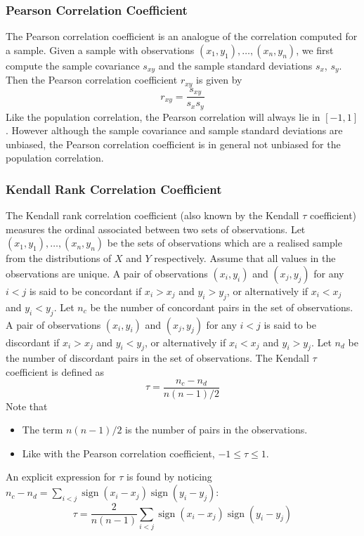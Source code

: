\documentclass[11pt]{report} %
\begin{document}
\subsubsection{Pearson Correlation Coefficient}

The Pearson correlation coefficient is an analogue of the correlation computed for a sample. Given a sample with observations $\left(x_{1}, y_{1}\right), \dots, \left(x_{n}, y_{n}\right)$, we first compute the sample covariance $s_{xy}$ and the sample standard deviations $s_{x}$, $s_{y}$. Then the Pearson correlation coefficient $r_{xy}$ is given by
\begin{equation}
r_{xy} = \dfrac{s_{xy}}{s_{x}s_{y}}
\end{equation}
Like the population correlation, the Pearson correlation will always lie in $\left[-1, 1\right]$. However although the sample covariance and sample standard deviations are unbiased, the Pearson correlation coefficient is in general not unbiased for the population correlation.

\subsubsection{Kendall Rank Correlation Coefficient}

The Kendall rank correlation coefficient (also known by the Kendall $\tau$ coefficient) measures the ordinal associated between two sets of observations. Let $\left(x_{1}, y_{1}\right), \dots, \left(x_{n}, y_{n}\right)$ be the sets of observations which are a realised sample from the distributions of $X$ and $Y$ respectively. Assume that all values in the observations are unique. A pair of observations $\left(x_{i}, y_{i}\right)$ and $\left(x_{j}, y_{j}\right)$ for any $i < j$ is said to be concordant if $x_{i} > x_{j}$ and $y_{i} > y_{j}$, or alternatively if $x_{i} < x_{j}$ and $y_{i} < y_{j}$. Let $n_{c}$ be the number of concordant pairs in the set of observations. A pair of observations $\left(x_{i}, y_{i}\right)$ and $\left(x_{j}, y_{j}\right)$ for any $i < j$ is said to be discordant if $x_{i} > x_{j}$ and $y_{i} < y_{j}$, or alternatively if $x_{i} < x_{j}$ and $y_{i} > y_{j}$. Let $n_{d}$ be the number of discordant pairs in the set of observations. The Kendall $\tau$ coefficient is defined as
\begin{equation}
\tau = \dfrac{n_{c} - n_{d}}{n\left(n - 1\right)/2}
\end{equation}
Note that
\begin{itemize}
\item The term $n\left(n - 1\right)/2$ is the number of pairs in the observations.
\item Like with the Pearson correlation coefficient, $-1 \leq \tau \leq 1$.
\end{itemize}
An explicit expression for $\tau$ is found by noticing $n_{c} - n_{d} = \sum_{i < j}\operatorname{sign}\left(x_{i} - x_{j}\right)\operatorname{sign}\left(y_{i} - y_{j}\right)$:
\begin{equation}
\tau = \dfrac{2}{n\left(n - 1\right)}\sum_{i < j}\operatorname{sign}\left(x_{i} - x_{j}\right)\operatorname{sign}\left(y_{i} - y_{j}\right)
\end{equation}
\end{document}
